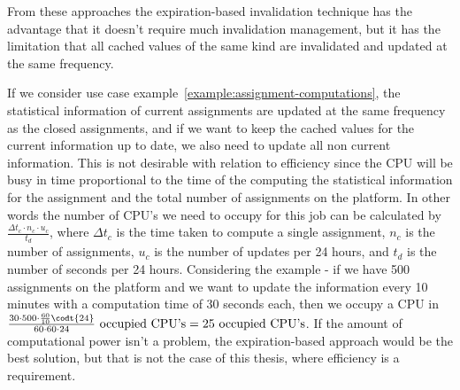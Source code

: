 From these approaches the expiration-based invalidation technique has the advantage that it doesn't require much invalidation management, but it has the limitation that all cached values of the same kind are invalidated and updated at the same frequency.

If we consider use case example~\ref{example:assignment-computations}, the statistical information of current assignments are updated at the same frequency as the closed assignments, and if we want to keep the cached values for the current information up to date, we also need to update all non current information. This is not desirable with relation to efficiency since the CPU will be busy in time proportional to the time of the computing the statistical information for the assignment and the total number of assignments on the platform. In other words the number of CPU's we need to occupy for this job can be calculated by $\frac{\Delta t_c \cdot n_c \cdot u_c}{t_d}$, where $\Delta t_c$ is the time taken to compute a single assignment, $n_c$ is the number of assignments, $u_c$ is the number of updates per 24 hours, and $t_d$ is the number of seconds per 24 hours. Considering the example - if we have 500 assignments on the platform and we want to update the information every 10 minutes with a computation time of 30 seconds each, then we occupy a CPU in $\frac{30 \cdot 500 \cdot \frac{60}{10} \codt {24}}{60 \cdot 60 \cdot 24}\text{ occupied CPU's} = 25\text{ occupied CPU's}$. If the amount of computational power isn't a problem, the expiration-based approach would be the best solution, but that is not the case of this thesis, where efficiency is a requirement.


